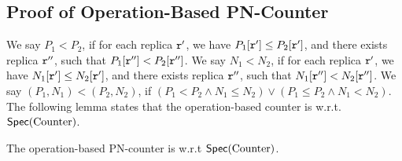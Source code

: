 \subsection{Proof of Operation-Based PN-Counter}
\label{subsec:proof of operation-based PN-counter}

We say $P_1<P_2$, if for each replica $\mathtt{r}'$, we have $P_1[\mathtt{r}'] \leq P_2[\mathtt{r}']$, and there exists replica $\mathtt{r}''$, such that $P_1[\mathtt{r}''] < P_2 [\mathtt{r}'']$. We say $N_1<N_2$, if for each replica $\mathtt{r}'$, we have $N_1[\mathtt{r}'] \leq N_2[\mathtt{r}']$, and there exists replica $\mathtt{r}''$, such that $N_1[\mathtt{r}''] < N_2 [\mathtt{r}'']$. We say $(P_1,N_1) < (P_2,N_2)$, if $(P_1 < P_2 \wedge N_1 \leq N_2) \vee (P_1 \leq P_2 \wedge N_1 < N_2)$. The following lemma states that the operation-based counter is \crdtlinearizable{} w.r.t. $\mathsf{Spec}(\text{Counter})$.

\begin{lemma}
\label{lemma:operation-based PN-counter is correct}
The operation-based PN-counter is \crdtlinearizable{} w.r.t $\mathsf{Spec}(\text{Counter})$.
\end{lemma}

